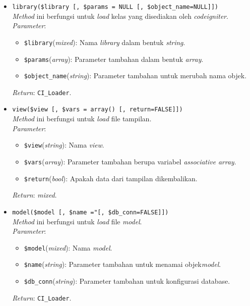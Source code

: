 \begin{itemize}
	\item \texttt{library(\$library [, \$params = NULL [, \$object\_name=NULL]])} \\
	\textit{Method} ini berfungsi untuk \textit{load} kelas yang disediakan oleh \textit{codeigniter}. \\
	\textit{Parameter}: 
	\begin{itemize}
		\item \texttt{\$library}(\textit{mixed}): Nama \textit{library} dalam bentuk \textit{string}.
		\item \texttt{\$params}(\textit{array}): Parameter tambahan dalam bentuk \textit{array}.
		\item \texttt{\$object\_name}(\textit{string}): Parameter tambahan untuk merubah nama objek.
	\end{itemize}
	\textit{Return}: \texttt{CI\_Loader}.
	\item \texttt{view(\$view [, \$vars = array() [, return=FALSE]])} \\
	\textit{Method} ini berfungsi untuk \textit{load} file tampilan. \\
	\textit{Parameter}:
	\begin{itemize}
		\item \texttt{\$view}(\textit{string}): Nama \textit{view}.
		\item \texttt{\$vars}(\textit{array}): Parameter tambahan berupa variabel \textit{associative array}.
		\item \texttt{\$return}(\textit{bool}): Apakah data dari tampilan dikembalikan.
	\end{itemize}
	\textit{Return}: \textit{mixed}.
	
	\item \texttt{model(\$model [, \$name ="[, \$db\_conn=FALSE]])} \\
	\textit{Method} ini berfungsi untuk \textit{load} file \textit{model}. \\
	\textit{Parameter}:
	\begin{itemize}
		\item \texttt{\$model}(\textit{mixed}): Nama \textit{model}.
		\item \texttt{\$name}(\textit{string}): Parameter tambahan untuk menamai objek\textit{model}.
		\item \texttt{\$db\_conn}(\textit{string}): Parameter tambahan untuk konfigurasi database.
	\end{itemize}
	\textit{Return}: \texttt{CI\_Loader}.
	

\end{itemize}
